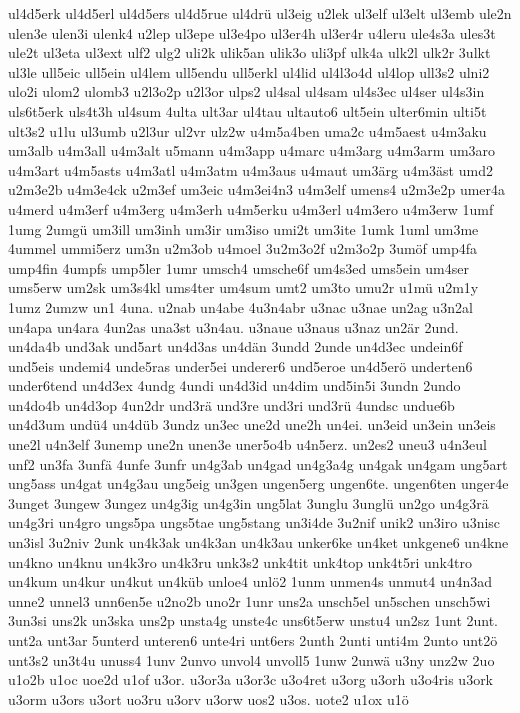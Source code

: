 {ul4d5erk
ul4d5erl
ul4d5ers
ul4d5rue
ul4drü
ul3eig
u2lek
ul3elf
ul3elt
ul3emb
ule2n
ulen3e
ulen3i
ulenk4
u2lep
ul3epe
ul3e4po
ul3er4h
ul3er4r
u4leru
ule4s3a
ules3t
ule2t
ul3eta
ul3ext
ulf2
ulg2
uli2k
ulik5an
ulik3o
uli3pf
ulk4a
ulk2l
ulk2r
3ulkt
ul3le
ull5eic
ull5ein
ul4lem
ull5endu
ull5erkl
ul4lid
ul4l3o4d
ul4lop
ull3s2
ulni2
ulo2i
ulom2
ulomb3
u2l3o2p
u2l3or
ulps2
ul4sal
ul4sam
ul4s3ec
ul4ser
ul4s3in
uls6t5erk
uls4t3h
ul4sum
4ulta
ult3ar
ul4tau
ultauto6
ult5ein
ulter6min
ulti5t
ult3s2
u1lu
ul3umb
u2l3ur
ul2vr
ulz2w
u4m5a4ben
uma2c
u4m5aest
u4m3aku
um3alb
u4m3all
u4m3alt
u5mann
u4m3app
u4marc
u4m3arg
u4m3arm
um3aro
u4m3art
u4m5asts
u4m3atl
u4m3atm
u4m3aus
u4maut
um3ärg
u4m3äst
umd2
u2m3e2b
u4m3e4ck
u2m3ef
um3eic
u4m3ei4n3
u4m3elf
umens4
u2m3e2p
umer4a
u4merd
u4m3erf
u4m3erg
u4m3erh
u4m5erku
u4m3erl
u4m3ero
u4m3erw
1umf
1umg
2umgü
um3ill
um3inh
um3ir
um3iso
umi2t
um3ite
1umk
1uml
um3me
4ummel
ummi5erz
um3n
u2m3ob
u4moel
3u2m3o2f
u2m3o2p
3umöf
ump4fa
ump4fin
4umpfs
ump5ler
1umr
umsch4
umsche6f
um4s3ed
ums5ein
um4ser
ums5erw
um2sk
um3s4kl
ums4ter
um4sum
umt2
um3to
umu2r
u1mü
u2m1y
1umz
2umzw
un1
4una.
u2nab
un4abe
4u3n4abr
u3nac
u3nae
un2ag
u3n2al
un4apa
un4ara
4un2as
una3st
u3n4au.
u3naue
u3naus
u3naz
un2är
2und.
un4da4b
und3ak
und5art
un4d3as
un4dän
3undd
2unde
un4d3ec
undein6f
und5eis
undemi4
unde5ras
under5ei
underer6
und5eroe
un4d5erö
underten6
under6tend
un4d3ex
4undg
4undi
un4d3id
un4dim
und5in5i
3undn
2undo
un4do4b
un4d3op
4un2dr
und3rä
und3re
und3ri
und3rü
4undsc
undue6b
un4d3um
undü4
un4düb
3undz
un3ec
une2d
une2h
un4ei.
un3eid
un3ein
un3eis
une2l
u4n3elf
3unemp
une2n
unen3e
uner5o4b
u4n5erz.
un2es2
uneu3
u4n3eul
unf2
un3fa
3unfä
4unfe
3unfr
un4g3ab
un4gad
un4g3a4g
un4gak
un4gam
ung5art
ung5ass
un4gat
un4g3au
ung5eig
un3gen
ungen5erg
ungen6te.
ungen6ten
unger4e
3unget
3ungew
3ungez
un4g3ig
un4g3in
ung5lat
3unglu
3unglü
un2go
un4g3rä
un4g3ri
un4gro
ungs5pa
ungs5tae
ung5stang
un3i4de
3u2nif
unik2
un3iro
u3nisc
un3isl
3u2niv
2unk
un4k3ak
un4k3an
un4k3au
unker6ke
un4ket
unkgene6
un4kne
un4kno
un4knu
un4k3ro
un4k3ru
unk3s2
unk4tit
unk4top
unk4t5ri
unk4tro
un4kum
un4kur
un4kut
un4küb
unloe4
unlö2
1unm
unmen4s
unmut4
un4n3ad
unne2
unnel3
unn6en5e
u2no2b
uno2r
1unr
uns2a
unsch5el
un5schen
unsch5wi
3un3si
uns2k
un3ska
uns2p
unsta4g
unste4c
uns6t5erw
unstu4
un2sz
1unt
2unt.
unt2a
unt3ar
5unterd
unteren6
unte4ri
unt6ers
2unth
2unti
unti4m
2unto
unt2ö
unt3s2
un3t4u
unuss4
1unv
2unvo
unvol4
unvoll5
1unw
2unwä
u3ny
unz2w
2uo
u1o2b
u1oc
uoe2d
u1of
u3or.
u3or3a
u3or3c
u3o4ret
u3org
u3orh
u3o4ris
u3ork
u3orm
u3ors
u3ort
uo3ru
u3orv
u3orw
uos2
u3os.
uote2
u1ox
u1ö
}
